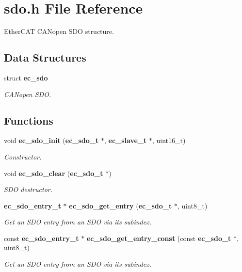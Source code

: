 \section{sdo.\-h File Reference}
\label{sdo_8h}


Ether\-C\-A\-T C\-A\-Nopen S\-D\-O structure.  


\subsection*{Data Structures}
\begin{DoxyCompactItemize}
\item 
struct {\bf ec\-\_\-sdo}
\begin{DoxyCompactList}\small\item\em C\-A\-Nopen S\-D\-O. \end{DoxyCompactList}\end{DoxyCompactItemize}
\subsection*{Functions}
\begin{DoxyCompactItemize}
\item 
void {\bf ec\-\_\-sdo\-\_\-init} ({\bf ec\-\_\-sdo\-\_\-t} $\ast$, {\bf ec\-\_\-slave\-\_\-t} $\ast$, uint16\-\_\-t)\label{sdo_8h_ac99e87366c0031106442aa389ce7f228}

\begin{DoxyCompactList}\small\item\em Constructor. \end{DoxyCompactList}\item 
void {\bf ec\-\_\-sdo\-\_\-clear} ({\bf ec\-\_\-sdo\-\_\-t} $\ast$)
\begin{DoxyCompactList}\small\item\em S\-D\-O destructor. \end{DoxyCompactList}\item 
{\bf ec\-\_\-sdo\-\_\-entry\-\_\-t} $\ast$ {\bf ec\-\_\-sdo\-\_\-get\-\_\-entry} ({\bf ec\-\_\-sdo\-\_\-t} $\ast$, uint8\-\_\-t)
\begin{DoxyCompactList}\small\item\em Get an S\-D\-O entry from an S\-D\-O via its subindex. \end{DoxyCompactList}\item 
const {\bf ec\-\_\-sdo\-\_\-entry\-\_\-t} $\ast$ {\bf ec\-\_\-sdo\-\_\-get\-\_\-entry\-\_\-const} (const {\bf ec\-\_\-sdo\-\_\-t} $\ast$, uint8\-\_\-t)
\begin{DoxyCompactList}\small\item\em Get an S\-D\-O entry from an S\-D\-O via its subindex. \end{DoxyCompactList}\end{DoxyCompactItemize}


